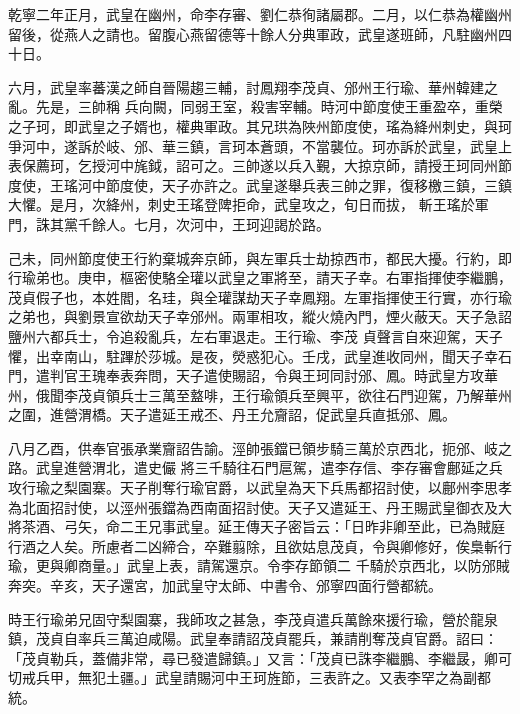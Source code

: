 \begin{pinyinscope}
 乾寧二年正月，武皇在幽州，命李存審、劉仁恭徇諸屬郡。二月，以仁恭為權幽州留後，從燕人之請也。留腹心燕留德等十餘人分典軍政，武皇遂班師，凡駐幽州四十日。



 六月，武皇率蕃漢之師自晉陽趨三輔，討鳳翔李茂貞、邠州王行瑜、華州韓建之亂。先是，三帥稱
 兵向闕，同弱王室，殺害宰輔。時河中節度使王重盈卒，重榮之子珂，即武皇之子婿也，權典軍政。其兄珙為陜州節度使，瑤為絳州刺史，與珂爭河中，遂訴於岐、邠、華三鎮，言珂本蒼頭，不當襲位。珂亦訴於武皇，武皇上表保薦珂，乞授河中旄鉞，詔可之。三帥遂以兵入覲，大掠京師，請授王珂同州節度使，王瑤河中節度使，天子亦許之。武皇遂舉兵表三帥之罪，復移檄三鎮，三鎮大懼。是月，次絳州，刺史王瑤登陴拒命，武皇攻之，旬日而拔，
 斬王瑤於軍門，誅其黨千餘人。七月，次河中，王珂迎謁於路。



 己未，同州節度使王行約棄城奔京師，與左軍兵士劫掠西市，都民大擾。行約，即行瑜弟也。庚申，樞密使駱全瓘以武皇之軍將至，請天子幸。右軍指揮使李繼鵬，茂貞假子也，本姓閻，名珪，與全瓘謀劫天子幸鳳翔。左軍指揮使王行實，亦行瑜之弟也，與劉景宣欲劫天子幸邠州。兩軍相攻，縱火燒內門，煙火蔽天。天子急詔鹽州六都兵士，令追殺亂兵，左右軍退走。王行瑜、李茂
 貞聲言自來迎駕，天子懼，出幸南山，駐蹕於莎城。是夜，熒惑犯心。壬戌，武皇進收同州，聞天子幸石門，遣判官王瑰奉表奔問，天子遣使賜詔，令與王珂同討邠、鳳。時武皇方攻華州，俄聞李茂貞領兵士三萬至盩啡，王行瑜領兵至興平，欲往石門迎駕，乃解華州之圍，進營渭橋。天子遣延王戒丕、丹王允齎詔，促武皇兵直抵邠、鳳。



 八月乙酉，供奉官張承業齎詔告諭。涇帥張鐺已領步騎三萬於京西北，扼邠、岐之路。武皇進營渭北，遣史儼
 將三千騎往石門扈駕，遣李存信、李存審會鄜延之兵攻行瑜之梨園寨。天子削奪行瑜官爵，以武皇為天下兵馬都招討使，以鄜州李思孝為北面招討使，以涇州張鐺為西南面招討使。天子又遣延王、丹王賜武皇御衣及大將茶酒、弓矢，命二王兄事武皇。延王傳天子密旨云：「日昨非卿至此，已為賊庭行酒之人矣。所慮者二凶締合，卒難翦除，且欲姑息茂貞，令與卿修好，俟梟斬行瑜，更與卿商量。」武皇上表，請駕還京。令李存節領二
 千騎於京西北，以防邠賊奔突。辛亥，天子還宮，加武皇守太師、中書令、邠寧四面行營都統。



 時王行瑜弟兄固守梨園寨，我師攻之甚急，李茂貞遣兵萬餘來援行瑜，營於龍泉鎮，茂貞自率兵三萬迫咸陽。武皇奉請詔茂貞罷兵，兼請削奪茂貞官爵。詔曰：「茂貞勒兵，蓋備非常，尋已發遣歸鎮。」又言：「茂貞已誅李繼鵬、李繼晸，卿可切戒兵甲，無犯土疆。」武皇請賜河中王珂旌節，三表許之。又表李罕之為副都統。




\end{pinyinscope}
